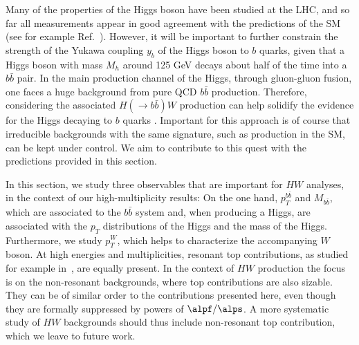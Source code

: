 Many of the properties of the Higgs boson have been studied at the LHC, and so far all measurements appear in good agreement with the
predictions of the SM (see for
example Ref.~\cite{Khachatryan:2016vau}). However, it will be important to further constrain the strength of the Yukawa coupling
$y_b$ of the Higgs
boson to $b$ quarks, given that a Higgs boson with mass $M_h$ around 125 GeV decays about half of the time into a $b\bar b$ pair. In the main
production channel of the Higgs, through gluon-gluon fusion, one faces
a huge background from pure QCD $b\bar b$ production. Therefore,
considering the associated $H(\rightarrow b\bar{b})W$ production can help solidify the evidence for the Higgs decaying to $b$ quarks \cite{ATLAS:hbb2017}. Important for this approach is of course that irreducible backgrounds with the same signature, such as \Wbb{} production in the SM, can be kept under control. We aim to contribute
to this quest with the predictions provided in this section.


In this section, we study three observables that are important for $HW$
analyses, in the context of our high-multiplicity results: On the one hand, $p_T^{b\bar b}$ and $M_{b\bar b}$, which are associated to the $b\bar
b$ system and, when producing a Higgs, are associated with the $p_T$ distributions of the
Higgs and the mass of the
Higgs. Furthermore, we study $p_T^W$, which helps to characterize the
accompanying $W$ boson. At high energies and multiplicities, resonant top contributions, as studied for example in~\cite{Denner:2017kzu}, are equally present. In the context of $HW$ production
the focus is on the non-resonant backgrounds, where top contributions are also sizable. They can be of similar order to the contributions presented here, even though they are formally suppressed by powers of $\alpf/\alps$. A more systematic study of $HW$ backgrounds should thus include non-resonant top contribution, which we leave to future work.

